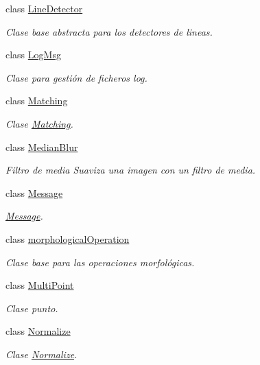 \begin{DoxyCompactItemize}
class \hyperlink{class_i3_d_1_1_line_detector}{Line\+Detector}
\begin{DoxyCompactList}\small\item\em Clase base abstracta para los detectores de lineas. \end{DoxyCompactList}\item 
class \hyperlink{class_i3_d_1_1_log_msg}{Log\+Msg}
\begin{DoxyCompactList}\small\item\em Clase para gestión de ficheros log. \end{DoxyCompactList}\item 
class \hyperlink{class_i3_d_1_1_matching}{Matching}
\begin{DoxyCompactList}\small\item\em Clase \hyperlink{class_i3_d_1_1_matching}{Matching}. \end{DoxyCompactList}\item 
class \hyperlink{class_i3_d_1_1_median_blur}{Median\+Blur}
\begin{DoxyCompactList}\small\item\em Filtro de media Suaviza una imagen con un filtro de media. \end{DoxyCompactList}\item 
class \hyperlink{class_i3_d_1_1_message}{Message}
\begin{DoxyCompactList}\small\item\em \hyperlink{class_i3_d_1_1_message}{Message}. \end{DoxyCompactList}\item 
class \hyperlink{class_i3_d_1_1morphological_operation}{morphological\+Operation}
\begin{DoxyCompactList}\small\item\em Clase base para las operaciones morfológicas. \end{DoxyCompactList}\item 
class \hyperlink{class_i3_d_1_1_multi_point}{Multi\+Point}
\begin{DoxyCompactList}\small\item\em Clase punto. \end{DoxyCompactList}\item 
class \hyperlink{class_i3_d_1_1_normalize}{Normalize}
\begin{DoxyCompactList}\small\item\em Clase \hyperlink{class_i3_d_1_1_normalize}{Normalize}. \end{DoxyCompactList}\item 

\end{DoxyCompactItemize}

